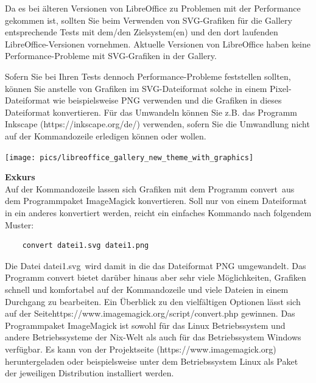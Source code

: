 \documentclass[12pt,a4paper,titlepage]{book}
\begin{document}
Da es bei älteren Versionen von LibreOffice zu Problemen mit der Performance gekommen ist, sollten Sie beim Verwenden von SVG-Grafiken für die Gallery entsprechende Tests mit dem/den Zielsystem(en) und den dort laufenden LibreOffice-Versionen vornehmen. Aktuelle Versionen von LibreOffice haben keine Performance-Probleme mit SVG-Grafiken in der Gallery.

Sofern Sie bei Ihren Tests dennoch Performance-Probleme feststellen sollten, können Sie anstelle von Grafiken im SVG-Dateiformat solche in einem Pixel-Dateiformat wie beispielsweise PNG verwenden und die Grafiken in dieses Dateiformat konvertieren. Für das Umwandeln können Sie z.B. das Programm Inkscape (https://inkscape.org/de/) verwenden, sofern Sie die Umwandlung nicht auf der Kommandozeile erledigen können oder wollen.

\begin{center}
	\captionsetup{type=figure}
	\texttt{[image: pics/libreoffice\_gallery\_new\_theme\_with\_graphics]}
	\label{fig:libreoffice_gallery_new_theme_with_graphics}
\end{center}


\bigskip\textbf{Exkurs}
\\

Auf der Kommandozeile lassen sich Grafiken mit dem Programm \glqq convert\grqq~aus dem Programmpaket ImageMagick konvertieren. Soll nur von einem Dateiformat in ein anderes konvertiert werden, reicht ein einfaches Kommando nach folgendem Muster:
\begin{lstlisting}
	convert datei1.svg datei1.png
\end{lstlisting}

Die Datei \glqq datei1.svg\grqq~wird damit in die das Dateiformat PNG umgewandelt. Das Programm convert bietet darüber hinaus aber sehr viele Möglichkeiten, Grafiken schnell und komfortabel auf der Kommandozeile und viele Dateien in einem Durchgang zu bearbeiten.
Ein Überblick zu den vielfältigen Optionen lässt sich auf der Seite\linebreak https://www.imagemagick.org/script/convert.php gewinnen. Das Programmpaket ImageMagick ist sowohl für das Linux Betriebssystem und andere Betriebssysteme der Nix-Welt als auch für das Betriebssystem Windows verfügbar. Es kann von der Projektseite (https://www.imagemagick.org) heruntergeladen oder beispielsweise unter dem Betriebssystem Linux als Paket der jeweiligen Distribution installiert werden.
\end{document}

